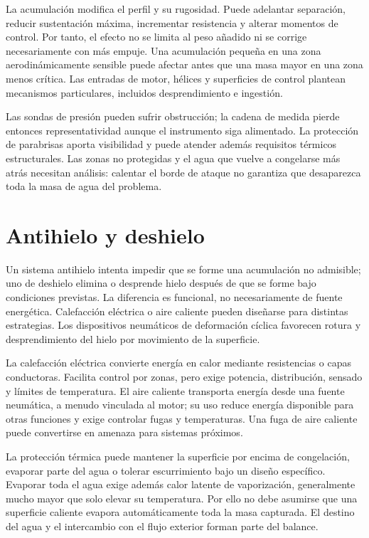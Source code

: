 La acumulación modifica el perfil y su rugosidad. Puede adelantar separación, reducir sustentación máxima, incrementar resistencia y alterar momentos de control. Por tanto, el efecto no se limita al peso añadido ni se corrige necesariamente con más empuje. Una acumulación pequeña en una zona aerodinámicamente sensible puede afectar antes que una masa mayor en una zona menos crítica. Las entradas de motor, hélices y superficies de control plantean mecanismos particulares, incluidos desprendimiento e ingestión.

Las sondas de presión pueden sufrir obstrucción; la cadena de medida pierde entonces representatividad aunque el instrumento siga alimentado. La protección de parabrisas aporta visibilidad y puede atender además requisitos térmicos estructurales. Las zonas no protegidas y el agua que vuelve a congelarse más atrás necesitan análisis: calentar el borde de ataque no garantiza que desaparezca toda la masa de agua del problema.

\section{Antihielo y deshielo}
Un sistema antihielo intenta impedir que se forme una acumulación no admisible; uno de deshielo elimina o desprende hielo después de que se forme bajo condiciones previstas. La diferencia es funcional, no necesariamente de fuente energética. Calefacción eléctrica o aire caliente pueden diseñarse para distintas estrategias. Los dispositivos neumáticos de deformación cíclica favorecen rotura y desprendimiento del hielo por movimiento de la superficie.

La calefacción eléctrica convierte energía en calor mediante resistencias o capas conductoras. Facilita control por zonas, pero exige potencia, distribución, sensado y límites de temperatura. El aire caliente transporta energía desde una fuente neumática, a menudo vinculada al motor; su uso reduce energía disponible para otras funciones y exige controlar fugas y temperaturas. Una fuga de aire caliente puede convertirse en amenaza para sistemas próximos.

La protección térmica puede mantener la superficie por encima de congelación, evaporar parte del agua o tolerar escurrimiento bajo un diseño específico. Evaporar toda el agua exige además calor latente de vaporización, generalmente mucho mayor que solo elevar su temperatura. Por ello no debe asumirse que una superficie caliente evapora automáticamente toda la masa capturada. El destino del agua y el intercambio con el flujo exterior forman parte del balance.

